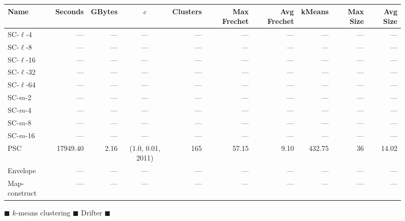 \clearpage
\newpage 
%
\clearpage
%
    \begin{figure} \begin{center}
        \begin{minipage}{\textwidth}
    {
    \begin{tabular}{@{}lrrcrrrrrr@{}}
        \toprule
        Name & Seconds & GBytes & $c$ & Clusters & Max Frechet & Avg Frechet & kMeans & Max Size & Avg Size\\
        \midrule
                SC-$\ell$-4 & --- & --- & --- & --- & --- & --- & --- & --- & ---\\
SC-$\ell$-8 & --- & --- & --- & --- & --- & --- & --- & --- & ---\\
SC-$\ell$-16 & --- & --- & --- & --- & --- & --- & --- & --- & ---\\
SC-$\ell$-32& --- & --- & --- & --- & --- & --- & --- & --- & ---\\
SC-$\ell$-64 & --- & --- & --- & --- & --- & --- & --- & --- & ---\\
SC-$m$-2 & --- & --- & --- & --- & --- & --- & --- & --- & ---\\
SC-$m$-4 & --- & --- & --- & --- & --- & --- & --- & --- & ---\\
SC-$m$-8 & --- & --- & --- & --- & --- & --- & --- & --- & ---\\
SC-$m$-16 & --- & --- & --- & --- & --- & --- & --- & --- & ---\\
        PSC & 17949.40 & 2.16 & (1.0, 0.01, 2011) & 165 & 57.15 & 9.10 & 432.75 & 36 & 14.02\\
        Envelope & --- & --- & --- & --- & --- & --- & --- & --- & ---\\
Map-construct & --- & --- & --- & --- & --- & --- & --- & --- & ---\\
        \bottomrule
    \end{tabular}}
\end{minipage}
        \caption{$\blacksquare$ $k$-means clustering $\blacksquare$ Drifter $\blacksquare$}
%
    \end{center} \end{figure}
\clearpage
\newpage 
%
\clearpage
%
